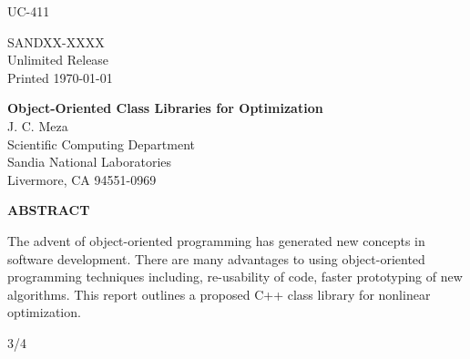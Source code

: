 \begin{titlepage}
\pagestyle{empty}

\hfill UC-411\\
\begin{center}

SANDXX-XXXX \\
Unlimited Release \\
Printed \today

\vspace*{1.2cm}
{\bf Object-Oriented Class Libraries for Optimization}
\\

\vspace*{1.2cm}
  J. C. Meza \\
  Scientific Computing Department \\
  Sandia National Laboratories \\
  Livermore, CA 94551-0969 \\

\vspace*{1.2cm}

{\bf ABSTRACT} \\
\vspace*{0.5cm}
\end{center}

The advent of object-oriented programming has generated new concepts
in software development. There are many advantages to using
object-oriented programming techniques including, re-usability of
code, faster prototyping of new algorithms. This report outlines a
proposed C++ class library for nonlinear optimization.

\vfill
\begin{center} 3/4 \end{center}

\end{titlepage}

